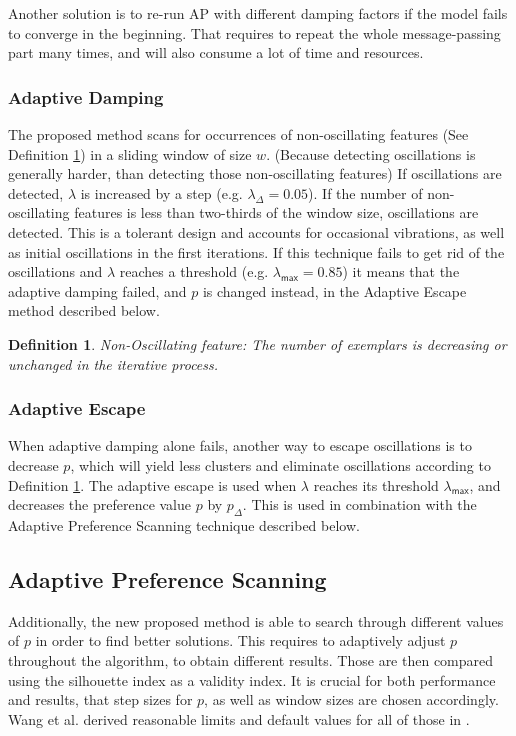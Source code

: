 \documentclass[11pt,a4paper]{article}
\newtheorem{definition}{Definition}
\begin{document}
Another solution is to re-run AP with different damping factors if the model fails to converge in the beginning. That requires to repeat the whole message-passing part many times, and will also consume a lot of time and resources. \cite{wang2008adaptive}

\subsubsection{Adaptive Damping}
The proposed method scans for occurrences of non-oscillating features (See Definition \ref{def:nonosc}) in a sliding window of size $w$. (Because detecting oscillations is generally harder, than detecting those non-oscillating features) If oscillations are detected, $\lambda$ is increased by a step (e.g. $\lambda_\Delta = 0.05$). If the number of non-oscillating features is less than two-thirds of the window size, oscillations are detected. This is a tolerant design and accounts for occasional vibrations, as well as initial oscillations in the first iterations. \cite{wang2008adaptive} If this technique fails to get rid of the oscillations and $\lambda$ reaches a threshold (e.g. $\lambda_{\mathsf{max}} = 0.85$) it means that the adaptive damping failed, and $p$ is changed instead, in the Adaptive Escape method described below.
\begin{definition}\label{def:nonosc}
	Non-Oscillating feature: The number of exemplars is decreasing or unchanged in the iterative process. \cite{wang2008adaptive}
\end{definition}
\subsubsection{Adaptive Escape}
When adaptive damping alone fails, another way to escape oscillations is to decrease $p$, which will yield less clusters and eliminate oscillations according to Definition \ref{def:nonosc}. The adaptive escape is used when $\lambda$ reaches its threshold $\lambda_{\mathsf{max}}$, and decreases the preference value $p$ by $p_{\Delta}$. \cite{wang2008adaptive} This is used in combination with the Adaptive Preference Scanning technique described below.
\subsection{Adaptive Preference Scanning}
Additionally, the new proposed method is able to search through different values of $p$ in order to find better solutions. This requires to adaptively adjust $p$ throughout the algorithm, to obtain different results. Those are then compared using the silhouette index \cite{ROUSSEEUW198753} as a validity index. It is crucial for both performance and results, that step sizes for $p$, as well as window sizes are chosen accordingly. Wang et al. derived reasonable limits and default values for all of those in \cite{wang2008adaptive}.
\pagebreak
\end{document}
